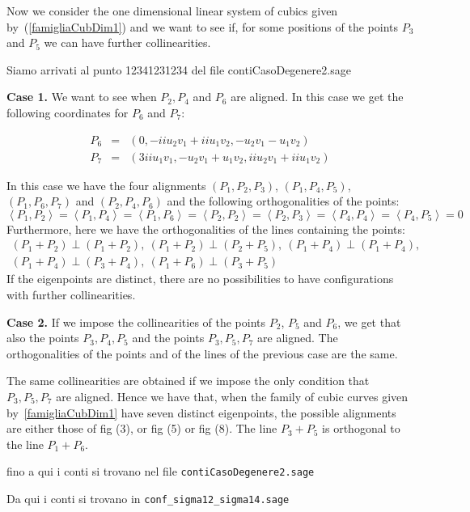 \documentclass[10pt, a4paper, reqno, captions=tableheading,bibliography=totoc]{scrartcl}
\theoremstyle{plain}
\theoremstyle{definition}
\newcommand{\scl}[2]{\left\langle {#1}, {#2} \right\rangle}
\begin{document}
Now we consider the one dimensional linear system of cubics given
by~(\ref{famigliaCubDim1}) and we want to see if, for some positions
of the points $P_3$ and $P_5$ we can have further collinearities.

Siamo arrivati al punto 12341231234 del file contiCasoDegenere2.sage


\textbf{Case 1.} We want to see when $P_2, P_4$ and $P_6$ are aligned. 
In this case we get the following coordinates for $P_6$ and $P_7$:

\begin{eqnarray*}
P_6 & = & \left(0, -\mathit{ii}u_2v_1 + \mathit{ii}u_1v_2, 
-u_2v_1 - u_1v_2\right)\\
P_7 & = & \left(3\mathit{ii}u_1v_1, -u_2v_1 + u_1v_2,
\mathit{ii}u_2v_1 + \mathit{ii}u_1v_2\right)
\end{eqnarray*}

In this case we have the four alignments $(P_1, P_2, P_3)$, $(P_1, P_4, P_5)$,
$(P_1, P_6, P_7)$ and $(P_2, P_4, P_6)$ and the following orthogonalities
of the points:
\[
\scl{P_1}{P_2} = \scl{P_1}{P_4} = \scl{P_1}{P_6} = 
\scl{P_2}{P_2} = \scl{P_2}{P_3} = \scl{P_4}{P_4} = 
\scl{P_4}{P_5} = 0
\]
Furthermore, here we have the orthogonalities of the lines containing
the points:
\[
\begin{array}{l}
(P_1+P_2) \perp (P_1+P_2), \ (P_1+P_2) \perp (P_2+P_5), \
  (P_1+P_4) \perp (P_1+P_4), \\
  (P_1+P_4) \perp (P_3+P_4), \ (P_1+P_6) \perp (P_3+P_5)
\end{array}
  \]
If the eigenpoints are distinct, there are no possibilities to have 
configurations with further collinearities.

\textbf{Case 2.} If we impose the collinearities of the points
$P_2$, $P_5$ and $P_6$, we get that also the points $P_3, P_4, P_5$ and
the points $P_3, P_5, P_7$ are aligned. The orthogonalities of the
points and of the lines of the previous case are the same.

The same collinearities are obtained if we impose the only condition
that $P_3, P_5, P_7$ are aligned. Hence we have that, when the family of
cubic curves given by~\ref{famigliaCubDim1} have seven distinct
eigenpoints,  the possible alignments are either those of fig (3),
or fig (5) or fig (8). The line $P_3+P_5$ is orthogonal to the line $P_1+P_6$.

fino a qui i conti si trovano nel file \verb+contiCasoDegenere2.sage+
\bigskip

Da qui i conti si trovano in \verb+conf_sigma12_sigma14.sage+
\end{document}
